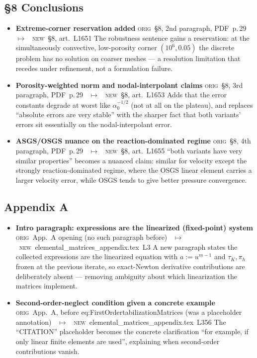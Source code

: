 \documentclass[11pt]{article}
\newcommand{\Orig}{\textcolor{origc}{\footnotesize\textsc{orig}}}
\newcommand{\New}{\textcolor{newc}{\footnotesize\textsc{new}}}
\newcommand{\code}[1]{\textcolor{newc}{\ttfamily\small #1}}
\newcommand{\pdfp}[1]{PDF~p.\,#1}
\newcommand{\artl}[1]{art.\ L#1}       %
\newcommand{\appl}[2]{#1~L#2}          %
\newcommand{\ch}[4]{%
  \item \textbf{#1}\newline
    {\footnotesize\Orig\ #2 \ \textcolor{locc}{$\longmapsto$} \ \New\ #3}\newline
    #4}
\begin{document}
\subsection{\S8 Conclusions}
\begin{itemize}
\ch{Extreme-corner reservation added}
   {\S8, 2nd paragraph, \pdfp{29}}
   {\S8, \artl{1651}}
   {The robustness sentence gains a reservation: at the simultaneously convective, low-porosity corner
    $(10^6,0.05)$ the discrete problem has no solution on coarser meshes --- a resolution limitation
    that recedes under refinement, not a formulation failure.}
\ch{Porosity-weighted norm and nodal-interpolant claims}
   {\S8, 3rd paragraph, \pdfp{29}}
   {\S8, \artl{1653}}
   {Adds that the error constants degrade at worst like $\alpha_0^{-1/2}$ (not at all on the plateau),
    and replaces ``absolute errors are very stable'' with the sharper fact that both variants' errors
    sit essentially on the nodal-interpolant error.}
\ch{ASGS/OSGS nuance on the reaction-dominated regime}
   {\S8, 4th paragraph, \pdfp{29}}
   {\S8, \artl{1655}}
   {``both variants have very similar properties'' becomes a nuanced claim: similar for velocity except
    the strongly reaction-dominated regime, where the OSGS linear element carries a larger velocity
    error, while OSGS tends to give better pressure convergence.}
\end{itemize}

\subsection{Appendix A}
\begin{itemize}
\ch{Intro paragraph: expressions are the linearized (fixed-point) system}
   {App.~A opening (no such paragraph before)}
   {\appl{elemental\_matrices\_appendix.tex}{3}}
   {A new paragraph states the collected expressions are the linearized equation with
    $a{:=}u^{m-1}$ and $\tau_K,\pi_h$ frozen at the previous iterate, so exact-Newton derivative
    contributions are deliberately absent --- removing ambiguity about which linearization the matrices
    implement.}
\ch{Second-order-neglect condition given a concrete example}
   {App.~A, before \code{eq:FirstOrdertabilizationMatrices} (was a placeholder annotation)}
   {\appl{elemental\_matrices\_appendix.tex}{356}}
   {The ``CITATION'' placeholder becomes the concrete clarification ``for example, if only linear
    finite elements are used'', explaining when second-order contributions vanish.}
\end{itemize}
\end{document}
